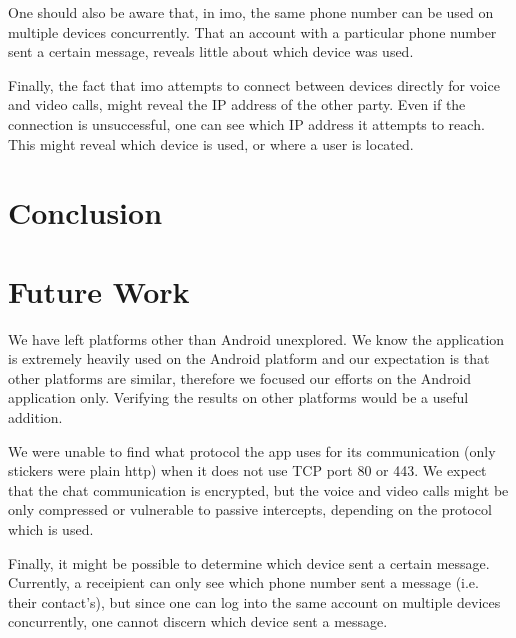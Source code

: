 \documentclass[conference]{IEEEtran}
\begin{document}
One should also be aware that, in imo, the same phone number can be used on
multiple devices concurrently. That an account with a particular phone number
sent a certain message, reveals little about which device was used.

Finally, the fact that imo attempts to connect between devices directly for
voice and video calls, might reveal the IP address of the other party. Even if
the connection is unsuccessful, one can see which IP address it attempts to
reach. This might reveal which device is used, or where a user is located.


\section{Conclusion}\label{sec:conc}



\section{Future Work}\label{sec:futwork}

We have left platforms other than Android unexplored. We know the application
is extremely heavily used on the Android platform and our expectation is that
other platforms are similar, therefore we focused our efforts on the Android
application only. Verifying the results on other platforms would be a useful
addition.

We were unable to find what protocol the app uses for its communication (only
stickers were plain http) when it does not use TCP port 80 or 443. We expect
that the chat communication is encrypted, but the voice and video calls might
be only compressed or vulnerable to passive intercepts, depending on the
protocol which is used.

Finally, it might be possible to determine which device sent a certain message.
Currently, a receipient can only see which phone number sent a message (i.e.
their contact's), but since one can log into the same account on multiple
devices concurrently, one cannot discern which device sent a message.


\printbibliography
\end{document}
